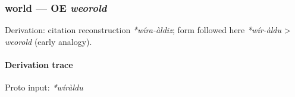 \documentclass[
  british,
  a4paper,
]{article}
\begin{document}
\subsubsection{\texorpdfstring{world --- OE
\emph{weorold}}{world --- OE weorold}}\label{world-oe-weorold}

Derivation: citation reconstruction \emph{*wíra-àldiz}; form followed
here \emph{*wír-àldu} \textgreater{} \emph{weorold} (early analogy).

\paragraph{Derivation trace}\label{derivation-trace-120}

Proto input: \emph{*wíràldu}

\begingroup
\setlength{\fboxsep}{6pt}
\end{document}
